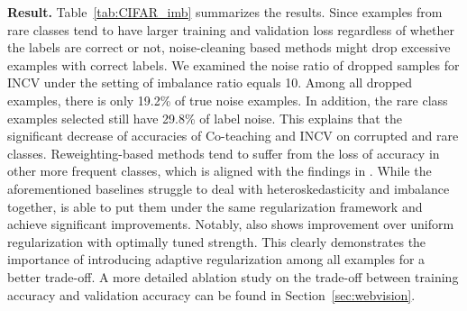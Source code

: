 \textbf{Result.} Table~\ref{tab:CIFAR_imb} summarizes the results. Since examples from rare classes tend to have larger training and validation loss regardless of whether the labels are correct or not, noise-cleaning based methods might drop excessive examples with correct labels. We examined the noise ratio of dropped samples for INCV under the setting of imbalance ratio equals 10. Among all dropped examples, there is only 19.2\% of true noise examples. In addition, the rare class examples selected still have 29.8\% of label noise. This explains that the significant decrease of accuracies of Co-teaching and INCV on corrupted and rare classes. Reweighting-based methods tend to suffer from the loss of accuracy in other more frequent classes, which is aligned with the findings in \citet{cao2019learning}. While the aforementioned baselines struggle to deal with heteroskedasticity and imbalance together, \ours{} is able to put them under the same regularization framework and achieve significant improvements. Notably, \ours{} also shows improvement over uniform regularization with optimally tuned strength. This clearly demonstrates the importance of introducing adaptive regularization among all examples for a better trade-off. A more detailed ablation study on the trade-off between training accuracy and validation accuracy can be found in Section~\ref{sec:webvision}.

